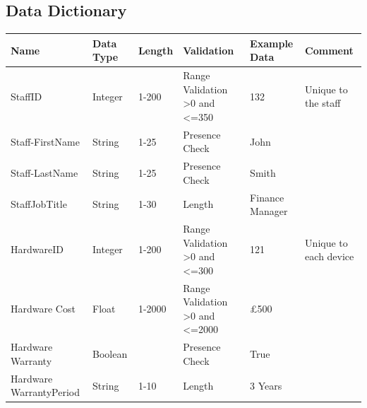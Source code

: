 \subsection{Data Dictionary}

\begin{center}
\begin{longtable}{|p{2cm}|p{1.14cm}|p{1.1cm}|p{1.7cm}|p{1.7cm}|p{2cm}|}
\hline
\textbf{Name} & \textbf{Data Type}& \textbf{Length} & \textbf{Validation} & \textbf{Example Data} & \textbf{Comment}      \\ \hline
StaffID                             & Integer                                 & 1-200                     & Range Validation \textgreater0 and \textless=350                                 & 132                   & Unique to the staff   \\ \hline
Staff-FirstName                      & String                                  & 1-25                                 & Presence Check                           & John                  &                       \\ \hline
Staff-LastName                       & String                                  & 1-25                                 & Presence Check                           & Smith                 &                       \\ \hline
StaffJobTitle			& String				& 1-30			& Length			& Finance Manager		&		\\ \hline
HardwareID                          & Integer                                 & 1-200                                & Range Validation \textgreater0 and  \textless=300                      & 121                   & Unique to each device \\ \hline
Hardware Cost                       & Float                                 & 1-2000                             & Range Validation \textgreater0 and \textless=2000                                    & £500                  &                       \\ \hline
Hardware Warranty                    & Boolean                                 &                                      & Presence Check                           & True                  &                       \\ \hline
Hardware WarrantyPeriod              & String                                  & 1-10                                 & Length                                   & 3 Years               &                       \\ \hline

\end{longtable}
\end{center}
